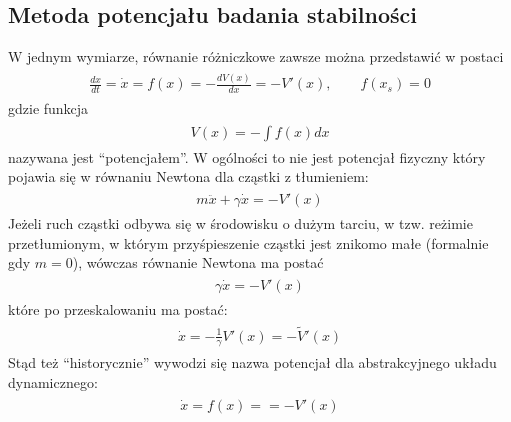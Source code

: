 \documentclass[a4paper,12pt,polish]{sphinxmanual}
\begin{document}
\subsection{Metoda potencjału badania stabilności}
\label{ch1/chI023:metoda-potencjalu-badania-stabilnosci}
W jednym wymiarze, równanie różniczkowe  zawsze można przedstawić w postaci
\label{ch1/chI023:equation-eqn18}\begin{gather}
\begin{split}\frac{dx}{dt} = \dot x = f(x) = -\frac{dV(x)}{dx} = -V'(x), \qquad f(x_s) = 0\end{split}\label{ch1/chI023-eqn18}
\end{gather}
gdzie funkcja
\label{ch1/chI023:equation-eqn19}\begin{gather}
\begin{split}V(x) = -\int f(x)  dx\end{split}\label{ch1/chI023-eqn19}
\end{gather}
nazywana jest ``potencjałem''.  W ogólności to nie jest potencjał fizyczny który pojawia się w równaniu Newtona  dla cząstki z tłumieniem:
\label{ch1/chI023:equation-eqn20}\begin{gather}
\begin{split}m \ddot x + \gamma \dot x = -V'(x)\end{split}\label{ch1/chI023-eqn20}
\end{gather}
Jeżeli ruch cząstki odbywa się w środowisku o dużym  tarciu, w tzw. reżimie przetłumionym, w którym przyśpieszenie cząstki jest znikomo małe (formalnie gdy $m=0$), wówczas równanie Newtona ma postać
\label{ch1/chI023:equation-eqn21}\begin{gather}
\begin{split}\gamma \dot x = -V'(x)\end{split}\label{ch1/chI023-eqn21}
\end{gather}
które po przeskalowaniu ma postać:
\label{ch1/chI023:equation-eqn22}\begin{gather}
\begin{split}\dot x = -\frac{1}{\gamma} V'(x) = - {\tilde V} '(x)\end{split}\label{ch1/chI023-eqn22}
\end{gather}
Stąd też ``historycznie'' wywodzi się nazwa potencjał dla abstrakcyjnego układu dynamicznego:
\label{ch1/chI023:equation-eqn23}\begin{gather}
\begin{split} \dot x = f(x) =  = -V'(x)\end{split}\label{ch1/chI023-eqn23}
\end{gather}
\end{document}
